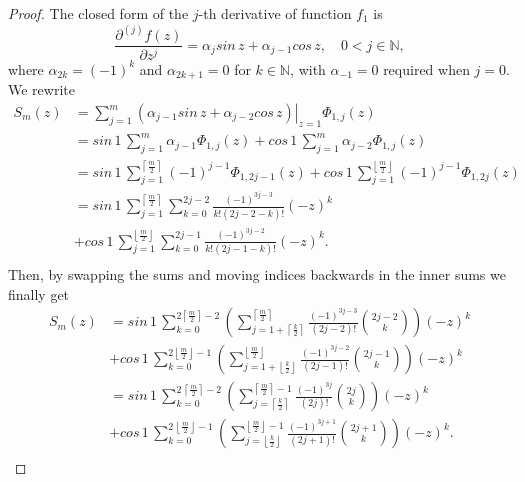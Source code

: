 \begin{proof}
The closed form of the $j$-th derivative of function $f_1$ is
$$\frac{\partial^{(j)}{f}(z)}{\partial{z}^{j}} = \alpha_{j}sin\,{z} +
\alpha_{j-1}cos\,{z}, \quad 0<j\in\mathbb{N},$$ where
$\alpha_{2k} = (-1)^{k}$ and $\alpha_{2k+1} = 0$ for $k\in\mathbb{N}$, with 
$\alpha_{-1}=0$ required when $j=0$. We rewrite
\begin{displaymath}
\begin{split}
  S_{m}(z) &= \sum_{j=1}^{m}{ \left. \left(\alpha_{j-1}sin\,{z} + \alpha_{j-2}cos\,{z}\right) \right|_{z=1}\Phi_{1,j}(z)} \\
       &= sin\,{1}\,\sum_{j=1}^{m}{ \alpha_{j-1}\Phi_{1,j}(z)} + cos\,{1}\,\sum_{j=1}^{m}{ \alpha_{j-2}\Phi_{1,j}(z)} \\
       &= sin\,{1}\,\sum_{j=1}^{\left\lceil \frac{m}{2} \right\rceil}{ (-1)^{j-1}\Phi_{1,2j-1}(z)} 
        + cos\,{1}\,\sum_{j=1}^{\left\lfloor \frac{m}{2} \right\rfloor}{ (-1)^{j-1}\Phi_{1,2j}(z)} \\
       &= sin\,{1}\,\sum_{j=1}^{\left\lceil \frac{m}{2} \right\rceil}{\sum_{k=0}^{2j-2}{ \frac{(-1)^{3j-3}}{k!(2j-2-k)!}{(-z)^{k}}} }\\
       &+ cos\,{1}\,\sum_{j=1}^{\left\lfloor \frac{m}{2} \right\rfloor}{\sum_{k=0}^{2j-1}{ \frac{(-1)^{3j-2}}{k!(2j-1-k)!}{(-z)^{k}}}}. \\
\end{split}
\end{displaymath}
Then, by swapping the sums and moving indices backwards in the inner sums we
finally get
\begin{displaymath}
\begin{split}
  S_{m}(z)  &= sin\,{1}\,\sum_{k=0}^{2 \left\lceil \frac{m}{2} \right\rceil-2}{\left(\sum_{j=1+\left\lceil \frac{k}{2}\right\rceil}^{\left\lceil \frac{m}{2} \right\rceil}{\frac{(-1)^{3j-3}}{(2j-2)!}{2j-2\choose k}}\right) {(-z)^{k}}}\\
            &+ cos\,{1}\,\sum_{k=0}^{2 \left\lfloor \frac{m}{2} \right\rfloor-1}{\left(\sum_{j=1+\left\lfloor \frac{k}{2}\right\rfloor}^{\left\lfloor \frac{m}{2} \right\rfloor}{ \frac{(-1)^{3j-2}}{(2j-1)!} {2j-1\choose k}}\right){(-z)^{k}}} \\
            &= sin\,{1}\,\sum_{k=0}^{2\,\left\lceil \frac{m}{2} \right\rceil-2}{\left(\sum_{j=\left\lceil \frac{k}{2}\right\rceil}^{\left\lceil \frac{m}{2} \right\rceil -1}{\frac{(-1)^{3j}}{(2j)!}{2j\choose k}}\right) {(-z)^{k}}}\\
            &+ cos\,{1}\,\sum_{k=0}^{2\,\left\lfloor \frac{m}{2} \right\rfloor-1}{\left(\sum_{j=\left\lfloor \frac{k}{2}\right\rfloor}^{\left\lfloor \frac{m}{2} \right\rfloor -1}{\frac{(-1)^{3j+1}}{(2j + 1)!} {2j+1\choose k}}\right){(-z)^{k}}}. \\
\end{split}
\end{displaymath}
\qedhere
\end{proof}

